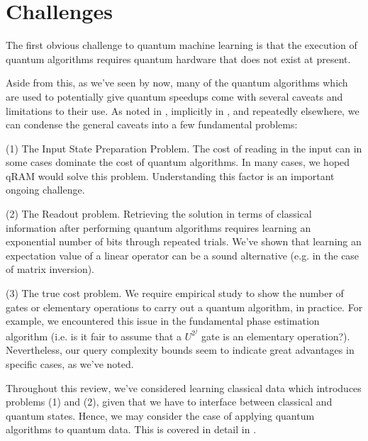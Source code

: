 \documentclass[12]{amsart}
\newcommand\0{\mathbf{0}}
\newcommand\<{\langle}
\renewcommand\>{\rangle}
\begin{document}
\section{Challenges}

The first obvious challenge to quantum machine learning is that the execution of quantum algorithms requires quantum hardware that does not exist at present. 

Aside from this, as we've seen by now, many of the quantum algorithms which are used to potentially give quantum speedups come with several caveats and limitations to their use. As noted in \cite{biamonte2017quantum}, implicitly in \cite{aaronson2015read}, and repeatedly elsewhere, we can condense the general caveats into a few fundamental problems: 

(1) The Input State Preparation Problem. The cost of reading in the input can in some cases dominate the cost of quantum algorithms. In many cases, we hoped qRAM would solve this problem. Understanding this factor is an important ongoing challenge.

(2) The Readout problem. Retrieving the solution in terms of classical information after performing quantum algorithms requires learning an exponential number of bits through repeated trials. We've shown that learning an expectation value of a linear operator can be a sound alternative (e.g. in the case of matrix inversion).

(3) The true cost problem. We require empirical study to show the number of gates or elementary operations to carry out a quantum algorithm, in practice. For example, we encountered this issue in the fundamental phase estimation algorithm (i.e. is it fair to assume that a $U^{2^j}$ gate is an elementary operation?). Nevertheless, our query complexity bounds seem to indicate great advantages in specific cases, as we've noted.

Throughout this review, we've considered learning classical data which introduces problems (1) and (2), given that we have to interface between classical and quantum states. Hence, we may consider the case of applying quantum algorithms to quantum data. This is covered in detail in \cite{aaronson2007learnability}.


\nocite{*}


\end{document}
